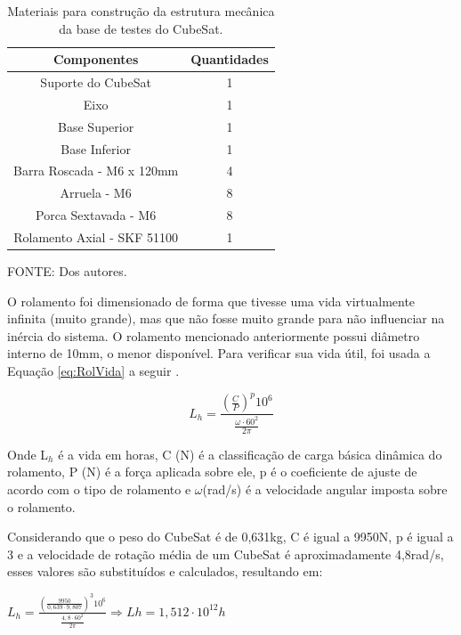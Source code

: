 \documentclass[
	12pt,				%
	openany,			%
	twoside,			%
	a4paper,			%
	english,			%
	french,				%
	spanish,			%
	brazil,				%
	oldfontcommands
	]{abntex2}
\begin{document}
\begin{table}[h]
	\caption{Materiais para construção da estrutura mecânica da base de testes do CubeSat.}
		\centering
	\begin{tabular}{|c|c|}
		\hline
		\textbf{Componentes} & \textbf{Quantidades} \\ 
		\hline 
		Suporte do CubeSat & 1 \\ 
		\hline 
		Eixo & 1 \\
		\hline
		Base Superior & 1 \\ 
		\hline 
		Base Inferior & 1 \\
		\hline 
		Barra Roscada - M6 x 120mm & 4 \\
		\hline 
		Arruela - M6 & 8 \\ 
		\hline 
		Porca Sextavada - M6 & 8 \\ 
		\hline 
		Rolamento Axial - SKF 51100 & 1 \\
		\hline
	\end{tabular}
	
	\begin{small}
	\vspace{3pt}	
	FONTE: Dos autores.
	\end{small}
	\label{tab:MatTB}
\end{table}

O rolamento foi dimensionado de forma que tivesse uma vida virtualmente infinita (muito grande), mas que não fosse muito grande para não influenciar na inércia do sistema. O rolamento mencionado anteriormente possui diâmetro interno de 10mm, o menor disponível. Para verificar sua vida útil, foi usada a Equação \ref{eq:RolVida} a seguir \cite{ProjMaq}.

\begin{equation}
L_{h} = \frac{ \left( \frac{C}{P} \right)^{p} 10^{6}}{\frac{\omega \cdot 60^{2}}{2 \pi}}
\label{eq:RolVida}
\end{equation}

Onde L$_{h}$ é a vida em horas, C (N) é a classificação de carga básica dinâmica do rolamento, P (N) é a força aplicada sobre ele, p é o coeficiente de ajuste de acordo com o tipo de rolamento e $\omega$(rad/s) é a velocidade angular imposta sobre o rolamento.

Considerando que o peso do CubeSat é de 0,631kg, C é igual a 9950N, p é igual a 3 e a velocidade de rotação média de um CubeSat é aproximadamente 4,8rad/s, esses valores são substituídos e calculados, resultando em:

\begin{center}
$L_{h} = \frac{ \left( \frac{9950}{0,639 \cdot 9,807 } \right)^{3} 10^{6}}{\frac{4,8 \cdot 60^{2}}{2 \pi}} \Longrightarrow Lh = 1,512 \cdot 10^{12} h$
\end{center}
\end{document}
